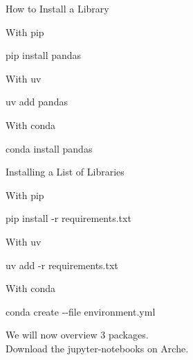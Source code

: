 \documentclass[serif, aspectratio=169]{beamer}
\begin{document}
\begin{frame}{How to Install a Library}
    \begin{block}{With pip}
        \vspace{5pt}
        \begin{CLI}
            pip install pandas
        \end{CLI}
    \end{block}
    \begin{block}{With uv}
        \vspace{5pt}
        \begin{CLI}
            uv add pandas
        \end{CLI}
    \end{block}
    \begin{block}{With conda}
        \vspace{5pt}
        \begin{CLI}
            conda install pandas
        \end{CLI}
    \end{block}
\end{frame}

\begin{frame}{Installing a List of Libraries}
        \begin{block}{With pip}
        \vspace{5pt}
        \begin{CLI}
            pip install -r requirements.txt
        \end{CLI}
    \end{block}
    \begin{block}{With uv}
        \vspace{5pt}
        \begin{CLI}
            uv add -r requirements.txt
        \end{CLI}
    \end{block}
    \begin{block}{With conda}
        \vspace{5pt}
        \begin{CLI}
            conda create -\nothing{}-file environment.yml
        \end{CLI}
    \end{block}
\end{frame}

\begin{exoframe}{}
    \begin{center}
        \Large
        We will now overview 3 packages. \\
        Download the jupyter-notebooks on Arche.
    \end{center}
\end{exoframe}
\end{document}
